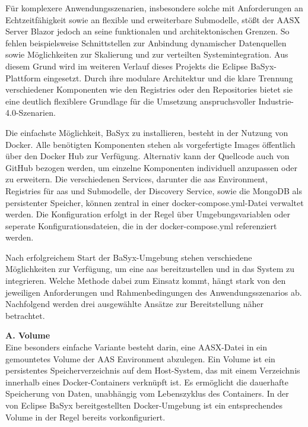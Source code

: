 Für komplexere Anwendungsszenarien, insbesondere solche mit Anforderungen an Echtzeitfähigkeit sowie an flexible und erweiterbare Submodelle, stößt der AASX Server Blazor jedoch an seine funktionalen und architektonischen Grenzen. 
So fehlen beispielsweise Schnittstellen zur Anbindung dynamischer Datenquellen sowie Möglichkeiten zur Skalierung und zur verteilten Systemintegration.
Aus diesem Grund wird im weiteren Verlauf dieses Projekts die Eclipse BaSyx-Plattform eingesetzt.
Durch ihre modulare Architektur und die klare Trennung verschiedener Komponenten wie den Registries oder den Repositories bietet sie eine deutlich flexiblere Grundlage für die Umsetzung anspruchsvoller Industrie-4.0-Szenarien.

Die einfachste Möglichkeit, BaSyx zu installieren, besteht in der Nutzung von Docker.
Alle benötigten Komponenten stehen als vorgefertigte Images öffentlich über den Docker Hub \cite{BaSyxDockerHub} zur Verfügung. 
Alternativ kann der Quellcode auch von GitHub \cite{BaSyxGithub} bezogen werden, um einzelne Komponenten individuell anzupassen oder zu erweitern.
Die verschiedenen Services, darunter die \acs{aas} Environment, Registries für \acs{aas} und Submodelle, der Discovery Service, sowie die MongoDB als persistenter Speicher, können zentral in einer docker-compose.yml-Datei verwaltet werden.
Die Konfiguration erfolgt in der Regel über Umgebungsvariablen oder seperate Konfigurationsdateien, die in der docker-compose.yml referenziert werden.

Nach erfolgreichem Start der BaSyx-Umgebung stehen verschiedene Möglichkeiten zur Verfügung, um eine \acs{aas} bereitzustellen und in das System zu integrieren. 
Welche Methode dabei zum Einsatz kommt, hängt stark von den jeweiligen Anforderungen und Rahmenbedingungen des Anwendungsszenarios ab.
Nachfolgend werden drei ausgewählte Ansätze zur Bereitstellung näher betrachtet.

\vspace{0.5em}
\noindent\textbf{A. Volume}\\
Eine besonders einfache Variante besteht darin, eine AASX-Datei in ein gemountetes Volume der AAS Environment abzulegen.
Ein Volume ist ein persistentes Speicherverzeichnis auf dem Host-System, das mit einem Verzeichnis innerhalb eines Docker-Containers verknüpft ist.
Es ermöglicht die dauerhafte Speicherung von Daten, unabhängig vom Lebenszyklus des Containers.
In der von Eclipse BaSyx bereitgestellten Docker-Umgebung ist ein entsprechendes Volume in der Regel bereits vorkonfiguriert.

